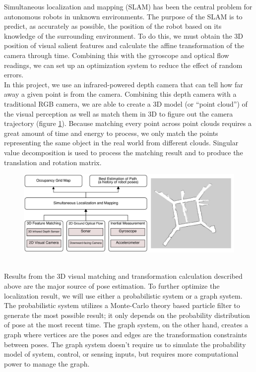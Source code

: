 \documentclass[12pt, letterpaper]{article}
\begin{document}
Simultaneous localization and mapping (SLAM) has been the central problem for autonomous robots in unknown environments. The purpose of the SLAM is to predict, as accurately as possible, the position of the robot based on its knowledge of the surrounding environment.  To do this, we must obtain the 3D position of visual salient features and calculate the affine transformation of the camera through time. Combining this with the gyroscope and optical flow readings, we can set up an optimization system to reduce the effect of random errors.
\vspace{1.0em}\\
In this project, we use an infrared-powered depth camera that can tell how far away a given point is from the camera. Combining this depth camera with a traditional RGB camera, we are able to create a 3D model (or ``point cloud'') of the visual perception as well as match them in 3D to figure out the camera trajectory (figure \ref{fig:slam}). Because matching every point across point clouds requires a great amount of time and energy to process, we only match the points representing the same object in the real world from different clouds. Singular value decomposition is used to process the matching result and to produce the translation and rotation matrix.
\begin{figure}[h]
\centering
\includegraphics[width=16cm]{images/SLAM.pdf}
\label{fig:slam}
\end{figure}
\vspace{1.0em}\\
Results from the 3D visual matching and transformation calculation described above are the major source of pose estimation. To further optimize the localization result, we will use either a probabilistic system or a graph system. The probabilistic system utilizes a Monte-Carlo theory based particle filter to generate the most possible result; it only depends on the probability distribution of pose at the most recent time. The graph system, on the other hand, creates a graph where vertices are the poses and edges are the transformation constraints between poses. The graph system doesn't require us to simulate the probability model of system, control, or sensing inputs, but requires more computational power to manage the graph.
\end{document}

